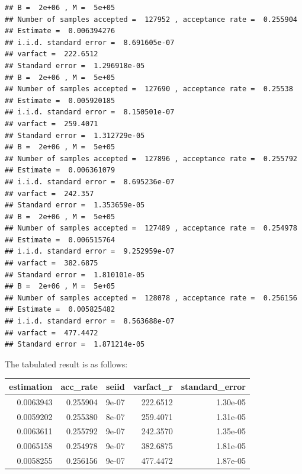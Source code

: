 \begin{knitrout}
\color{fgcolor}\begin{kframe}
\begin{verbatim}
## B =  2e+06 , M =  5e+05 
## Number of samples accepted =  127952 , acceptance rate =  0.255904 
## Estimate =  0.006394276 
## i.i.d. standard error =  8.691605e-07 
## varfact =  222.6512 
## Standard error =  1.296918e-05
## B =  2e+06 , M =  5e+05 
## Number of samples accepted =  127690 , acceptance rate =  0.25538 
## Estimate =  0.005920185 
## i.i.d. standard error =  8.150501e-07 
## varfact =  259.4071 
## Standard error =  1.312729e-05
## B =  2e+06 , M =  5e+05 
## Number of samples accepted =  127896 , acceptance rate =  0.255792 
## Estimate =  0.006361079 
## i.i.d. standard error =  8.695236e-07 
## varfact =  242.357 
## Standard error =  1.353659e-05
## B =  2e+06 , M =  5e+05 
## Number of samples accepted =  127489 , acceptance rate =  0.254978 
## Estimate =  0.006515764 
## i.i.d. standard error =  9.252959e-07 
## varfact =  382.6875 
## Standard error =  1.810101e-05
## B =  2e+06 , M =  5e+05 
## Number of samples accepted =  128078 , acceptance rate =  0.256156 
## Estimate =  0.005825482 
## i.i.d. standard error =  8.563688e-07 
## varfact =  477.4472 
## Standard error =  1.871214e-05
\end{verbatim}
\end{kframe}
\end{knitrout}
The tabulated result is as follows:\\
\begin{center}
\begin{knitrout}
\color{fgcolor}
\begin{tabular}{r|r|r|r|r}
\hline
estimation & acc\_rate & seiid & varfact\_r & standard\_error\\
\hline
0.0063943 & 0.255904 & 9e-07 & 222.6512 & 1.30e-05\\
\hline
0.0059202 & 0.255380 & 8e-07 & 259.4071 & 1.31e-05\\
\hline
0.0063611 & 0.255792 & 9e-07 & 242.3570 & 1.35e-05\\
\hline
0.0065158 & 0.254978 & 9e-07 & 382.6875 & 1.81e-05\\
\hline
0.0058255 & 0.256156 & 9e-07 & 477.4472 & 1.87e-05\\
\hline
\end{tabular}


\end{knitrout}
\end{center}

